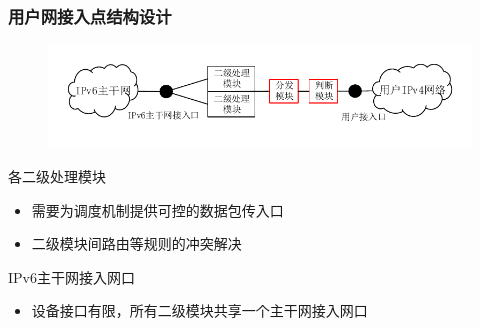 \documentclass{beamer}
\begin{document}
\begin{frame}
  \frametitle{用户网接入点结构设计}
  \begin{figure}
    \includegraphics[width=\textwidth]{figs/10-user-access-point-b.pdf}
  \end{figure}
  \vspace{-1em}

  \begin{block}{各二级处理模块}
    \begin{itemize}
    \item 需要为调度机制提供可控的数据包传入口
    \item 二级模块间路由等规则的冲突解决
    \end{itemize}
  \end{block}

  \begin{block}{IPv6主干网接入网口}
    \begin{itemize}
    \item 设备接口有限，所有二级模块共享一个主干网接入网口
    \end{itemize}
  \end{block}
\end{frame}
\end{document}
